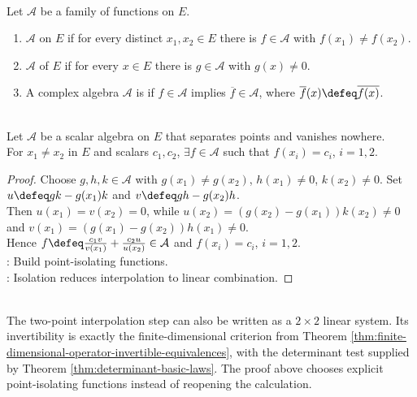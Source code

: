 \begin{definition} \label{def:separates-points-vanishes-nowhere-self-adjoint} \\
Let $\mathcal{A}$ be a family of functions on $E$.
\begin{enumerate}[label=(\roman*)]
\setlength{\itemsep}{0pt}
\item $\mathcal{A}$  on $E$ if for every distinct $x_1,x_2\in E$ there is $f\in\mathcal{A}$ with $f(x_1)\neq f(x_2)$.
\item $\mathcal{A}$  of $E$ if for every $x\in E$ there is $g\in\mathcal{A}$ with $g(x)\neq0$.
\item A complex algebra $\mathcal{A}$ is  if $f\in\mathcal{A}$ implies $\overline{f}\in\mathcal{A}$, where $\overline{f}(x)\defeq\overline{f(x)}$.
\end{enumerate}
\end{definition}

\begin{theorem} \label{thm:two-point-interpolation-in-separating-algebra} \\
Let $\mathcal{A}$ be a scalar algebra on $E$ that separates points and vanishes nowhere.\\
For $x_1\neq x_2$ in $E$ and scalars $c_1,c_2$, $\exists f\in\mathcal{A}$ such that $f(x_i)=c_i$, $i=1,2$.
\begin{proof} Choose $g,h,k\in\mathcal{A}$ with $g(x_1)\neq g(x_2)$, $h(x_1)\neq0$, $k(x_2)\neq0$. Set $u\defeq gk-g(x_1)k$ and $v\defeq gh-g(x_2)h$.\\
Then $u(x_1)=v(x_2)=0$, while $u(x_2)=(g(x_2)-g(x_1))k(x_2)\neq0$ and $v(x_1)=(g(x_1)-g(x_2))h(x_1)\neq0$.\\
Hence $f\defeq \frac{c_1v}{v(x_1)}+\frac{c_2u}{u(x_2)}\in\mathcal{A}$ and $f(x_i)=c_i$, $i=1,2$.\\
: Build point-isolating functions.\\
: Isolation reduces interpolation to linear combination.
\end{proof}
\end{theorem}

\begin{perspective} \label{per:stone-weierstrass-interpolation-linear-algebra} \\
The two-point interpolation step can also be written as a $2\times2$ linear system. Its invertibility is exactly the finite-dimensional criterion from Theorem \ref{thm:finite-dimensional-operator-invertible-equivalences}, with the determinant test supplied by Theorem \ref{thm:determinant-basic-laws}. The proof above chooses explicit point-isolating functions instead of reopening the calculation.
\end{perspective}

